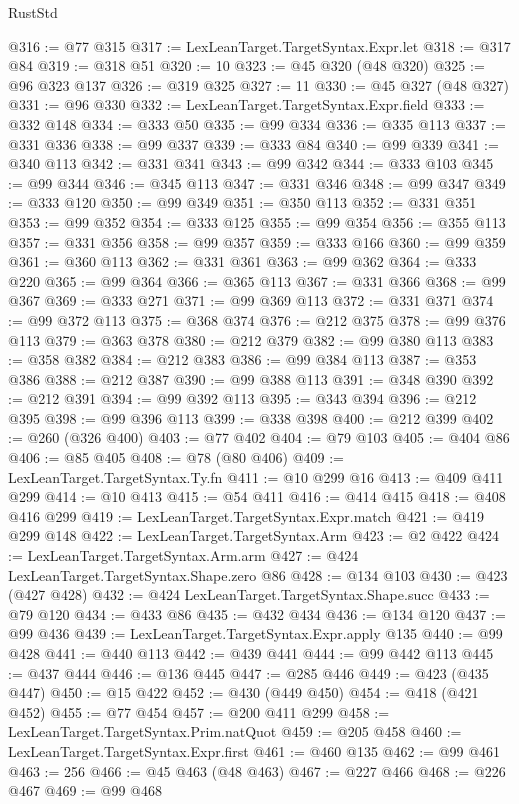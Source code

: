 \begin{lexlean}{RustStd}
\begin{coremodule}
@316 := @77 @315
@317 := LexLeanTarget.TargetSyntax.Expr.let
@318 := @317 @84
@319 := @318 @51
@320 := 10
@323 := @45 @320 (@48 @320)
@325 := @96 @323 @137
@326 := @319 @325
@327 := 11
@330 := @45 @327 (@48 @327)
@331 := @96 @330
@332 := LexLeanTarget.TargetSyntax.Expr.field
@333 := @332 @148
@334 := @333 @50
@335 := @99 @334
@336 := @335 @113
@337 := @331 @336
@338 := @99 @337
@339 := @333 @84
@340 := @99 @339
@341 := @340 @113
@342 := @331 @341
@343 := @99 @342
@344 := @333 @103
@345 := @99 @344
@346 := @345 @113
@347 := @331 @346
@348 := @99 @347
@349 := @333 @120
@350 := @99 @349
@351 := @350 @113
@352 := @331 @351
@353 := @99 @352
@354 := @333 @125
@355 := @99 @354
@356 := @355 @113
@357 := @331 @356
@358 := @99 @357
@359 := @333 @166
@360 := @99 @359
@361 := @360 @113
@362 := @331 @361
@363 := @99 @362
@364 := @333 @220
@365 := @99 @364
@366 := @365 @113
@367 := @331 @366
@368 := @99 @367
@369 := @333 @271
@371 := @99 @369 @113
@372 := @331 @371
@374 := @99 @372 @113
@375 := @368 @374
@376 := @212 @375
@378 := @99 @376 @113
@379 := @363 @378
@380 := @212 @379
@382 := @99 @380 @113
@383 := @358 @382
@384 := @212 @383
@386 := @99 @384 @113
@387 := @353 @386
@388 := @212 @387
@390 := @99 @388 @113
@391 := @348 @390
@392 := @212 @391
@394 := @99 @392 @113
@395 := @343 @394
@396 := @212 @395
@398 := @99 @396 @113
@399 := @338 @398
@400 := @212 @399
@402 := @260 (@326 @400)
@403 := @77 @402
@404 := @79 @103
@405 := @404 @86
@406 := @85 @405
@408 := @78 (@80 @406)
@409 := LexLeanTarget.TargetSyntax.Ty.fn
@411 := @10 @299 @16
@413 := @409 @411 @299
@414 := @10 @413
@415 := @54 @411
@416 := @414 @415
@418 := @408 @416 @299
@419 := LexLeanTarget.TargetSyntax.Expr.match
@421 := @419 @299 @148
@422 := LexLeanTarget.TargetSyntax.Arm
@423 := @2 @422
@424 := LexLeanTarget.TargetSyntax.Arm.arm
@427 := @424 LexLeanTarget.TargetSyntax.Shape.zero @86
@428 := @134 @103
@430 := @423 (@427 @428)
@432 := @424 LexLeanTarget.TargetSyntax.Shape.succ
@433 := @79 @120
@434 := @433 @86
@435 := @432 @434
@436 := @134 @120
@437 := @99 @436
@439 := LexLeanTarget.TargetSyntax.Expr.apply @135
@440 := @99 @428
@441 := @440 @113
@442 := @439 @441
@444 := @99 @442 @113
@445 := @437 @444
@446 := @136 @445
@447 := @285 @446
@449 := @423 (@435 @447)
@450 := @15 @422
@452 := @430 (@449 @450)
@454 := @418 (@421 @452)
@455 := @77 @454
@457 := @200 @411 @299
@458 := LexLeanTarget.TargetSyntax.Prim.natQuot
@459 := @205 @458
@460 := LexLeanTarget.TargetSyntax.Expr.first
@461 := @460 @135
@462 := @99 @461
@463 := 256
@466 := @45 @463 (@48 @463)
@467 := @227 @466
@468 := @226 @467
@469 := @99 @468

\end{coremodule}
\end{lexlean}

